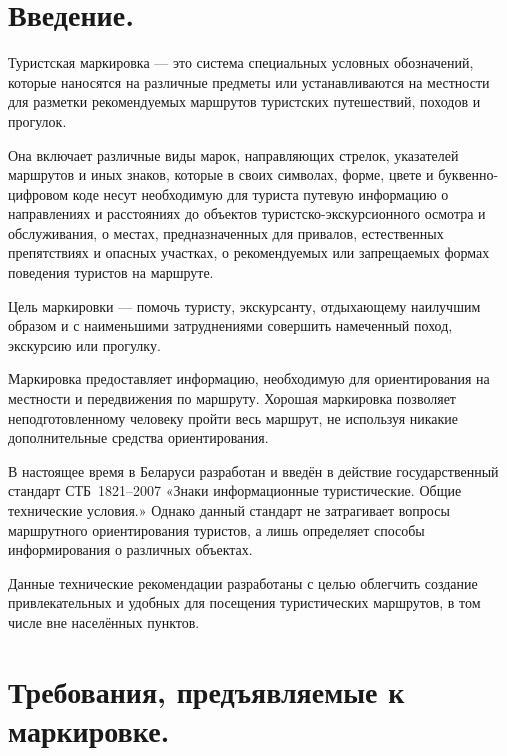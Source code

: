 \documentclass[a4paper,12pt]{extarticle}
\begin{document}
\section{Введение.}

Туристская маркировка --- это система специальных условных обозначений, которые наносятся на различные предметы или устанавливаются на местности для разметки рекомендуемых маршрутов туристских путешествий, походов и прогулок.

Она включает различные виды марок, направляющих стрелок, указателей маршрутов и иных знаков, которые в своих символах,
форме, цвете и буквенно-цифровом коде несут необходимую для туриста путевую информацию о направлениях и расстояниях до
объектов туристско-экскурсионного осмотра и обслуживания, о местах, предназначенных для привалов, естественных
препятствиях и опасных участках, о рекомендуемых или запрещаемых формах поведения туристов на маршруте.\cite{metodussr}

Цель маркировки --- помочь туристу, экскурсанту, отдыхающему наилучшим образом и с наименьшими затруднениями совершить
намеченный поход, экскурсию или прогулку.

Маркировка предоставляет информацию, необходимую для ориентирования на местности и передвижения по маршруту. Хорошая
маркировка позволяет неподготовленному человеку пройти весь маршрут, не используя никакие дополнительные средства
ориентирования.

В настоящее время в Беларуси разработан и введён в действие государственный стандарт СТБ~1821--2007 «Знаки
информационные туристические. Общие технические условия.» Однако данный стандарт не затрагивает вопросы маршрутного
ориентирования туристов, а лишь определяет способы информирования о различных объектах.

Данные технические рекомендации разработаны с целью облегчить создание привлекательных и удобных для посещения
туристических маршрутов, в том числе вне населённых пунктов.

\section{Требования, предъявляемые к маркировке.}
\end{document}

